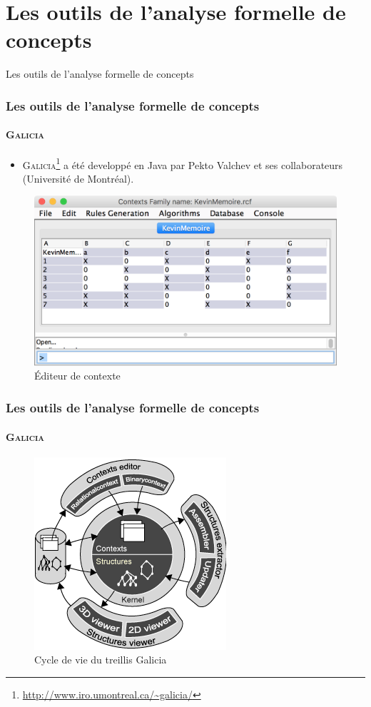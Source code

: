 \documentclass[french]{beamer}
\begin{document}
\section{Les outils de l'analyse formelle de concepts}
\begin{frame}
\huge{\centerline{Les outils de l'analyse formelle de concepts}}
\end{frame}
\begin{frame}
\frametitle{Les outils de l'analyse formelle de concepts}
\framesubtitle{\textsc{Galicia}}
\begin{itemize}
\item \textsc{Galicia}\footnote{\url{http://www.iro.umontreal.ca/~galicia/}} a été developpé en Java par Pekto Valchev et ses collaborateurs (Université de Montréal).
\end{itemize}
\begin{figure}[H]
\label{fig:galicia-ctx}
\begin{center}\includegraphics[scale=0.36]{figures/galicia1.jpg}\end{center}
\caption{Éditeur de contexte}
\end{figure}
\end{frame}
\begin{frame}
\frametitle{Les outils de l'analyse formelle de concepts}
\framesubtitle{\textsc{Galicia}}
\begin{figure}[H]
\begin{center}\includegraphics[scale=0.50]{figures/galicia-life-cycle.png}\end{center}
\caption{Cycle de vie du treillis Galicia}
\label{cap:fig:galicia-life-cycle}
\end{figure}
\end{frame}
\end{document}
